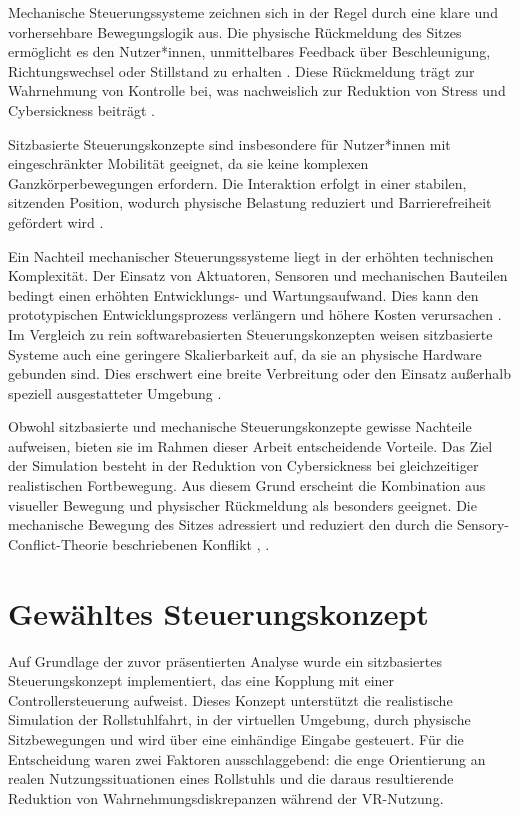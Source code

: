 Mechanische Steuerungssysteme zeichnen sich in der Regel durch eine klare und vorhersehbare Bewegungslogik aus. Die physische Rückmeldung des Sitzes ermöglicht es den Nutzer*innen, unmittelbares Feedback über Beschleunigung, Richtungswechsel oder Stillstand zu erhalten \cite{Jason2015}. Diese Rückmeldung trägt zur Wahrnehmung von Kontrolle bei, was nachweislich zur Reduktion von Stress und Cybersickness beiträgt \cite{Jason2015}.

Sitzbasierte Steuerungskonzepte sind insbesondere für Nutzer*innen mit eingeschränkter Mobilität geeignet, da sie keine komplexen Ganzkörperbewegungen erfordern. Die Interaktion erfolgt in einer stabilen, sitzenden Position, wodurch physische Belastung reduziert und Barrierefreiheit gefördert wird \cite{Clarkson2003}.

Ein Nachteil mechanischer Steuerungssysteme liegt in der erhöhten technischen Komplexität. Der Einsatz von Aktuatoren, Sensoren und mechanischen Bauteilen bedingt einen erhöhten Entwicklungs- und Wartungsaufwand. Dies kann den prototypischen Entwicklungsprozess verlängern und höhere Kosten verursachen \cite{Jason2015}. Im Vergleich zu rein softwarebasierten Steuerungskonzepten weisen sitzbasierte Systeme auch eine geringere Skalierbarkeit auf, da sie an physische Hardware gebunden sind. Dies erschwert eine breite Verbreitung oder den Einsatz außerhalb speziell ausgestatteter Umgebung \cite{Stanney2020}.

Obwohl sitzbasierte und mechanische Steuerungskonzepte gewisse Nachteile aufweisen, bieten sie im Rahmen dieser Arbeit entscheidende Vorteile. Das Ziel der Simulation besteht in der Reduktion von Cybersickness bei gleichzeitiger realistischen Fortbewegung. Aus diesem Grund erscheint die Kombination aus visueller Bewegung und physischer Rückmeldung als besonders geeignet. Die mechanische Bewegung des Sitzes adressiert und reduziert den durch die Sensory-Conflict-Theorie beschriebenen Konflikt \cite{Reason1975}, \cite{LaViola2000}.

\section{Gewähltes Steuerungskonzept}
Auf Grundlage der zuvor präsentierten Analyse wurde ein sitzbasiertes Steuerungskonzept implementiert, das eine Kopplung mit einer Controllersteuerung aufweist. Dieses Konzept unterstützt die realistische Simulation der Rollstuhlfahrt, in der virtuellen Umgebung, durch physische Sitzbewegungen und wird über eine einhändige Eingabe gesteuert. Für die Entscheidung waren zwei Faktoren ausschlaggebend: die enge Orientierung an realen Nutzungssituationen eines Rollstuhls und die daraus resultierende Reduktion von Wahrnehmungsdiskrepanzen während der VR-Nutzung.

